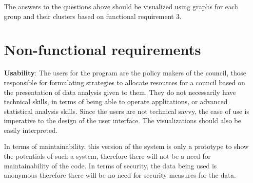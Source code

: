 The answers to the questions above should be visualized using graphs for each group and their clusters based on functional requirement 3. 

\section{Non-functional requirements}
\textbf{Usability}: The users for the program are the policy makers of the council, those responsible for formulating strategies to allocate resources for a council based on the presentation of data analysis given to them. They do not necessarily have technical skills, in terms of being able to operate applications, or advanced statistical analysis skills. Since the users are not technical savvy, the ease of use is imperative to the design of the user interface. The visualizations should also be easily interpreted. \par

In terms of maintainability, this version of the system is only a prototype to show the potentials of such a system, therefore there will not be a need for maintainability of the code. In terms of security, the data being used is anonymous therefore there will be no need for security measures for the data.


